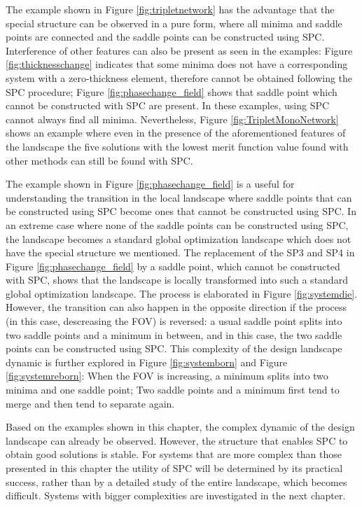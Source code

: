 The example shown in Figure \ref{fig:tripletnetwork} has the advantage that the special structure can be observed in a pure form, where all minima and saddle points are connected and the saddle points can be constructed using SPC. Interference of other features can also be present as seen in the examples: Figure \ref{fig:thicknesschange} indicates that some minima does not have a corresponding system with a zero-thickness element, therefore cannot be obtained following the SPC procedure; Figure \ref{fig:phasechange_field} shows that saddle point which cannot be constructed with SPC are present. In these examples, using SPC cannot always find all minima. Nevertheless, Figure \ref{fig:TripletMonoNetwork} shows an example where even in the presence of the aforementioned features of the landscape the five solutions with the lowest merit function value found with other methods can still be found with SPC.

The example shown in Figure \ref{fig:phasechange_field} is a useful for understanding the transition in the local landscape where saddle points that can be constructed using SPC become ones that cannot be constructed using SPC. In an extreme case where none of the saddle points can be constructed using SPC, the landscape becomes a standard global optimization landscape which does not have the special structure we mentioned. The replacement of the SP3 and SP4 in Figure \ref{fig:phasechange_field} by a saddle point, which cannot be constructed with SPC, shows that the landscape is locally transformed into such a standard global optimization landscape. The process is elaborated in Figure \ref{fig:systemdie}. However, the transition can also happen in the opposite direction if the process (in this case, descreasing the FOV) is reversed: a usual saddle point splits into two saddle points and a minimum in between, and in this case, the two saddle points can be constructed using SPC. This complexity of the design landscape dynamic is further explored in Figure \ref{fig:systemborn} and Figure \ref{fig:systemreborn}: When the FOV is increasing, a minimum splits into two minima and one saddle point; Two saddle points and a minimum first tend to merge and then tend to separate again. 

Based on the examples shown in this chapter, the complex dynamic of the design landscape can already be observed. However, the structure that enables SPC to obtain good solutions is stable. For systems that are more complex than those presented in this chapter the utility of SPC will be determined by its practical success, rather than by a detailed study of the entire landscape, which becomes difficult. Systems with bigger complexities are investigated in the next chapter. 

